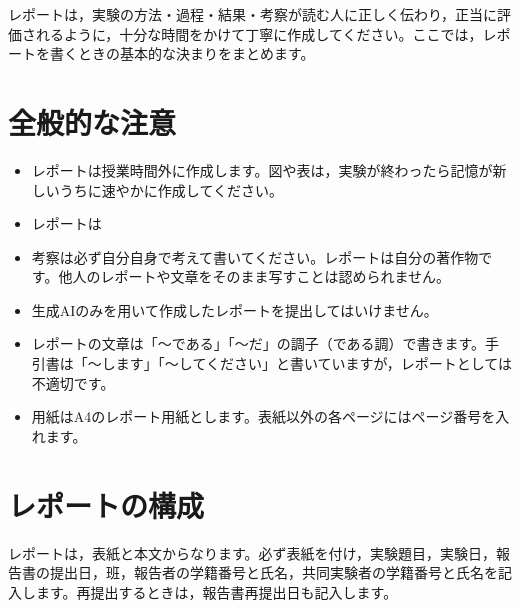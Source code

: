 

レポートは，実験の方法・過程・結果・考察が読む人に正しく伝わり，正当に評価されるように，十分な時間をかけて丁寧に作成してください。ここでは，レポートを書くときの基本的な決まりをまとめます。

\section{全般的な注意}

\begin{itemize}
  \item レポートは授業時間外に作成します。図や表は，実験が終わったら記憶が新しいうちに速やかに作成してください。
  \item レポートは
  \item 考察は必ず自分自身で考えて書いてください。レポートは自分の著作物です。他人のレポートや文章をそのまま写すことは認められません。
  \item 生成AIのみを用いて作成したレポートを提出してはいけません。
  \item レポートの文章は「〜である」「〜だ」の調子（である調）で書きます。手引書は「〜します」「〜してください」と書いていますが，レポートとしては不適切です。
  \item 用紙はA4のレポート用紙とします。表紙以外の各ページにはページ番号を入れます。
\end{itemize}

\section{レポートの構成}

レポートは，表紙と本文からなります。必ず表紙を付け，実験題目，実験日，報告書の提出日，班，報告者の学籍番号と氏名，共同実験者の学籍番号と氏名を記入します。再提出するときは，報告書再提出日も記入します。


